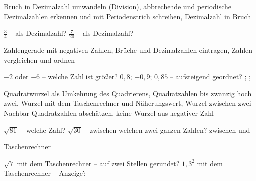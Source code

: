 \setcounter{aufgabe}{0}

\begin{aufgabe}{Bruch in Dezimalzahl umwandeln (Division), abbrechende und periodische Dezimalzahlen erkennen und mit Periodenstrich schreiben, Dezimalzahl in Bruch}
\begin{teile}
\teil $\frac{3}{4}$ – als Dezimalzahl? \leerfeld
\teil $\frac{7}{20}$ – als Dezimalzahl? \leerfeld
\end{teile}
\end{aufgabe}

\begin{aufgabe}{Zahlengerade mit negativen Zahlen, Brüche und Dezimalzahlen eintragen, Zahlen vergleichen und ordnen}
\begin{teile}
\teil $-2$ oder $-6$ – welche Zahl ist größer? \leerfeld
\teil $0{,}8$; $-0{,}9$; $0{,}85$ – aufsteigend geordnet? \leerfeld ; \leerfeld ; \leerfeld
\end{teile}
\end{aufgabe}

\begin{aufgabe}{Quadratwurzel als Umkehrung des Quadrierens, Quadratzahlen bis zwanzig hoch zwei, Wurzel mit dem Taschenrechner und Näherungswert, Wurzel zwischen zwei Nachbar-Quadratzahlen abschätzen, keine Wurzel aus negativer Zahl}
\begin{teile}
\teil $\sqrt{81}$ – welche Zahl? \leerfeld
\teil $\sqrt{30}$ – zwischen welchen zwei ganzen Zahlen? zwischen \leerfeld und \leerfeld
\end{teile}
\end{aufgabe}

\begin{aufgabe}{Taschenrechner}
\begin{teile}
\teil $\sqrt{7}$ mit dem Taschenrechner – auf zwei Stellen gerundet? \leerfeld
\teil $1{,}3^2$ mit dem Taschenrechner – Anzeige? \leerfeld
\end{teile}
\end{aufgabe}

